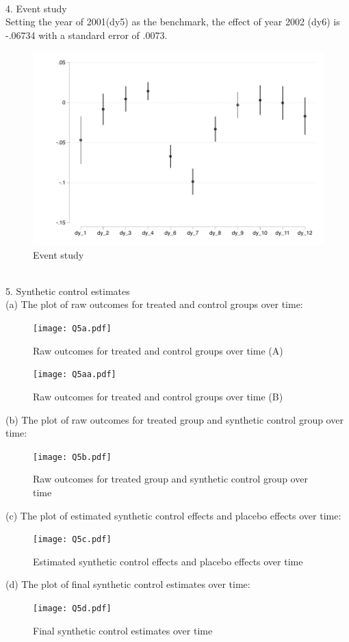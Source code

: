 \documentclass{article}
\begin{document}
\noindent
\\
4. Event study
\\ Setting the year of 2001(dy5) as the benchmark, the effect of year 2002 (dy6) is -.06734 with a standard error of .0073.
\smallskip
\begin{figure}[H]
    \centering
    \includegraphics[scale = 0.7]{Q4.pdf}
    \caption{Event study}
    \label{fig:Q1}
\end{figure}

\noindent
\\
5. Synthetic control estimates
\bigskip
\\(a) The plot of raw outcomes for treated and control groups over time:
\smallskip
\begin{figure}[H]
    \centering
    \texttt{[image: Q5a.pdf]}
    \caption{Raw outcomes for treated and control groups over time (A)}
    \label{fig:Q5a}
\end{figure}
\smallskip
\begin{figure}[H]
    \centering
    \texttt{[image: Q5aa.pdf]}
    \caption{Raw outcomes for treated and control groups over time (B)}
    \label{fig:Q5aa}
\end{figure}
(b) The plot of raw outcomes for treated group and synthetic control group over time:
\smallskip
\begin{figure}[H]
    \centering
    \texttt{[image: Q5b.pdf]}
    \caption{Raw outcomes for treated group and synthetic control group over time}
    \label{fig:Q5b}
\end{figure}
(c) The plot of estimated synthetic control effects and placebo effects over time:
\smallskip
\begin{figure}[H]
    \centering
    \texttt{[image: Q5c.pdf]}
    \caption{Estimated synthetic control effects and placebo effects over time}
    \label{fig:Q5c}
\end{figure}
(d) The plot of final synthetic control estimates over time:
\smallskip
\begin{figure}[H]
    \centering
    \texttt{[image: Q5d.pdf]}
    \caption{Final synthetic control estimates over time}
    \label{fig:Q5d}
\end{figure}
\end{document}
